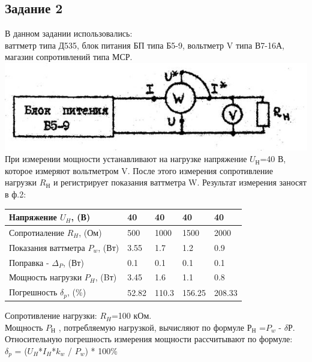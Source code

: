 
\newpage
\subsection*{Задание 2}
	В данном задании использовались:\\
ваттметр типа Д535, блок питания БП типа Б5-9, вольтметр V типа В7-16А, магазин сопротивлений типа МСР.\\
\includegraphics[width=\textwidth]{Part2.png}\\
	При измерении мощности устанавливают на нагрузке напряжение $U_{Н}$=40 В, которое измеряют вольтметром V. После этого измерения сопротивление нагрузки $R_{Н}$ и регистрирует показания ваттметра W. Результат измерения заносят в ф.2:\\

	\begin{table} [h!]
 	 	\begin{tabular}{|p{6cm}|p{2cm}|p{2cm}|p{2cm}|p{2cm}|}
		 	\hline
		 	Напряжение $U_{H}$, (В) & 40 & 40 & 40 & 40 \\
		 	\hline
		 	Сопротиаление $R_{H}$, (Ом) & 500 & 1000 & 1500 & 2000 \\
		 	\hline
		 	Показания ваттметра $P_{w}$, (Вт) & 3.55 & 1.7 & 1.2 & 0.9 \\
		 	\hline
		 	Поправка - $\Delta _{P}$, (Вт) & 0.1 & 0.1 & 0.1 & 0.1 \\
		 	\hline
		 	Мощность нагрузки $P_{H}$, (Bт) & 3.45 & 1.6 & 1.1 & 0.8 \\
		 	\hline
		 	Погрешность $\delta _{p}$, (\%) & 52.82 & 110.3 & 156.25 & 208.33 \\
		 	\hline
 		\end{tabular}
	\end{table}

 	\vspace{1cm}

 	Сопротивление нагрузки: $R_{H}$=100 кОм.\\
 	Мощность $P_{Н}$ , потребляемую нагрузкой, вычисляют по формуле $Р_{Н}$ =$P_{w}$ - $\delta$Р.\\
 	Относительную погрешность измерения мощности рассчитывают по формуле:\\
 	$\delta _{p}$ = ($U_{H}$*$I_{H}$*$k_{w}$ / $P_{w}$) * 100\%

